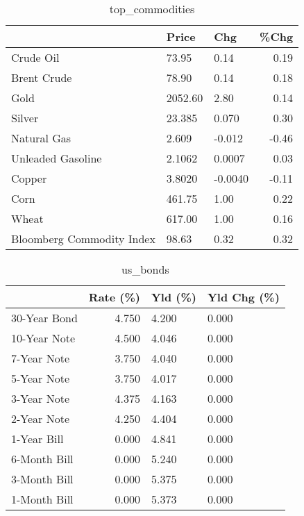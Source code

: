 \documentclass{article}%
\begin{document}
\begin{table}[htbp]%
\caption{top\_commodities}%
\centering%
\begin{adjustbox}{width=1\textwidth}%
\begin{tabular}{lllr}
\toprule
                          &   Price &     Chg &  \%Chg \\
\midrule
               Crude Oil  &   73.95 &    0.14 &  0.19 \\
             Brent Crude  &   78.90 &    0.14 &  0.18 \\
                    Gold  & 2052.60 &    2.80 &  0.14 \\
                  Silver  &  23.385 &   0.070 &  0.30 \\
             Natural Gas  &   2.609 &  -0.012 & -0.46 \\
       Unleaded Gasoline  &  2.1062 &  0.0007 &  0.03 \\
                  Copper  &  3.8020 & -0.0040 & -0.11 \\
                    Corn  &  461.75 &    1.00 &  0.22 \\
                   Wheat  &  617.00 &    1.00 &  0.16 \\
Bloomberg Commodity Index &   98.63 &    0.32 &  0.32 \\
\bottomrule
\end{tabular}
%
\end{adjustbox}%
\end{table}

%


\begin{table}[htbp]%
\caption{us\_bonds}%
\centering%
\begin{adjustbox}{width=1\textwidth}%
\begin{tabular}{lrll}
\toprule
             &  Rate (\%) & Yld (\%) & Yld Chg (\%) \\
\midrule
30-Year Bond &     4.750 &   4.200 &       0.000 \\
10-Year Note &     4.500 &   4.046 &       0.000 \\
 7-Year Note &     3.750 &   4.040 &       0.000 \\
 5-Year Note &     3.750 &   4.017 &       0.000 \\
 3-Year Note &     4.375 &   4.163 &       0.000 \\
 2-Year Note &     4.250 &   4.404 &       0.000 \\
 1-Year Bill &     0.000 &   4.841 &       0.000 \\
6-Month Bill &     0.000 &   5.240 &       0.000 \\
3-Month Bill &     0.000 &   5.375 &       0.000 \\
1-Month Bill &     0.000 &   5.373 &       0.000 \\
\bottomrule
\end{tabular}
%
\end{adjustbox}%
\end{table}
\end{document}
